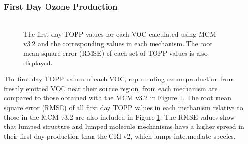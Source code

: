 \subsubsection{First Day Ozone Production} \label{sss:day1} %
%
\begin{figure}
    \centering
    \includegraphics[width=\textwidth]{img/first_day_values}
    \vspace{1mm}
    \caption{The first day TOPP values for each VOC calculated using MCM v3.2 and the corresponding values in each mechanism. The root mean square error (RMSE) of each set of TOPP values is also displayed.}
    \vspace{-4mm}
    \label{f:first_day}
\end{figure}
%
The first day TOPP values of each VOC, representing ozone production from freshly emitted VOC near their source region, from each mechanism are compared to those obtained with the MCM v3.{2} in Figure \ref{f:first_day}.
The root mean square error (RMSE) of all first day TOPP values in each mechanism relative to those in the MCM v3.2 are also included in Figure \ref{f:first_day}.  
The RMSE values show that lumped structure and lumped molecule mechanisms have a higher spread in their first day  production than the CRI v2, which lumps intermediate species.

